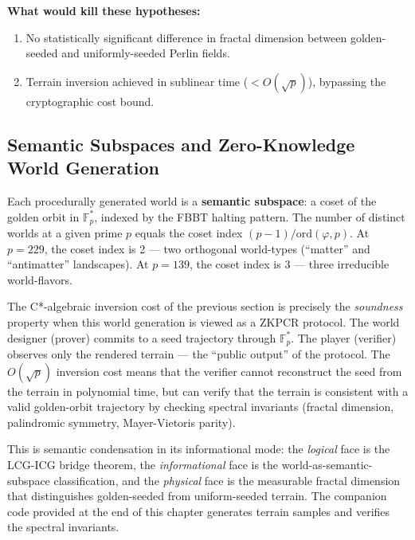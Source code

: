 \textbf{What would kill these hypotheses:}
\begin{enumerate}[noitemsep]
  \item No statistically significant difference in fractal dimension between golden-seeded and uniformly-seeded Perlin fields.
  \item Terrain inversion achieved in sublinear time ($< O(\sqrt{p})$), bypassing the cryptographic cost bound.
\end{enumerate}

\subsection*{Semantic Subspaces and Zero-Knowledge World Generation}

Each procedurally generated world is a \textbf{semantic subspace}: a coset of the golden orbit in $\mathbb{F}_p^*$, indexed by the FBBT halting pattern. The number of distinct worlds at a given prime $p$ equals the coset index $(p-1)/\mathrm{ord}(\varphi, p)$. At $p = 229$, the coset index is 2 --- two orthogonal world-types (``matter'' and ``antimatter'' landscapes). At $p = 139$, the coset index is 3 --- three irreducible world-flavors.

The C*-algebraic inversion cost of the previous section is precisely the \emph{soundness} property when this world generation is viewed as a ZKPCR protocol. The world designer (prover) commits to a seed trajectory through $\mathbb{F}_p^*$. The player (verifier) observes only the rendered terrain --- the ``public output'' of the protocol. The $O(\sqrt{p})$ inversion cost means that the verifier cannot reconstruct the seed from the terrain in polynomial time, but can verify that the terrain is consistent with a valid golden-orbit trajectory by checking spectral invariants (fractal dimension, palindromic symmetry, Mayer-Vietoris parity).

This is semantic condensation in its informational mode: the \emph{logical} face is the LCG-ICG bridge theorem, the \emph{informational} face is the world-as-semantic-subspace classification, and the \emph{physical} face is the measurable fractal dimension that distinguishes golden-seeded from uniform-seeded terrain. The companion code provided at the end of this chapter generates terrain samples and verifies the spectral invariants.



